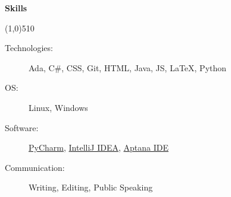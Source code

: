 \documentclass[letterpaper,11pt]{article}
\newcommand{\resheading}[1]{{\large {\begin{minipage}{\textwidth}{\textbf{#1 \vphantom{p\^{E}}}}\end{minipage}}}}
\begin{document}


\resheading{Skills}

\line(1,0){510}

	\begin{description}
		\item  [Technologies:] { \footnotesize 
			Ada, C\#, CSS, Git, HTML, Java, JS, \LaTeX, Python
		}
		\item[OS:] { \footnotesize
			Linux, Windows
		}
		
		\item[Software:]{\footnotesize \href{http://www.jetbrains.com/pycharm/}{PyCharm},
		\href{http://www.jetbrains.com/idea/}{IntelliJ IDEA},
		\href{http://www.aptana.com/}{Aptana IDE}

} 
		\item[Communication:] { \footnotesize
			Writing, Editing, Public Speaking
		}

	\end{description} %
\end{document}
